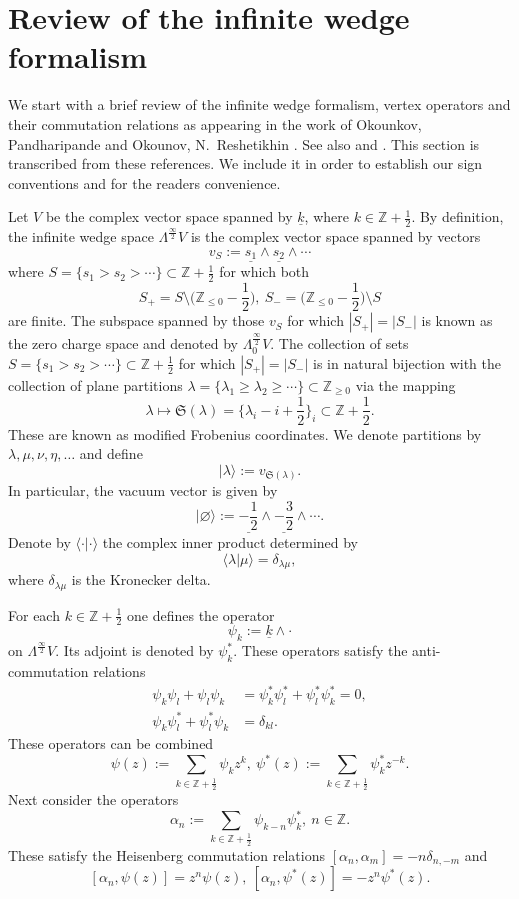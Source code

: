 \documentclass{amsart}
\theoremstyle{definition}
\newcommand{\ZZ} {\mathbb{Z}}		%
\begin{document}
\section{Review of the infinite wedge formalism}

We start with a brief review of the infinite wedge formalism, vertex operators and their commutation relations as appearing in the work of Okounkov, Pandharipande \cite{OP} and Okounov, N.~Reshetikhin \cite{OR}. See also \cite{Kac} and \cite{You}. This section is transcribed from these references. We include it in order to establish our sign conventions and for the readers convenience.

Let $V$ be the complex vector space spanned by $\underline{k}$, where $k \in \ZZ + \frac{1}{2}$. By definition, the infinite wedge space $\Lambda^{\frac{\infty}{2}} V$ is the complex vector space spanned by vectors
$$
v_S := \underline{s_1} \wedge \underline{s_2} \wedge \cdots
$$
where $S = \{s_1 > s_2 > \cdots\} \subset \ZZ + \frac{1}{2}$ for which both 
$$
S_+ = S \setminus \Big(\ZZ_{\leq 0} - \frac{1}{2} \Big), \ S_- = \Big(\ZZ_{\leq 0} - \frac{1}{2} \Big) \setminus S
$$ 
are finite. The subspace spanned by those $v_S$ for which $|S_+| = |S_-|$ is known as the zero charge space and denoted by $\Lambda^{\frac{\infty}{2}}_{0} V$. The collection of sets $S = \{s_1 > s_2 > \cdots\} \subset \ZZ + \frac{1}{2}$ for which $|S_+| = |S_-|$ is in natural bijection with the collection of plane partitions $\lambda = \{\lambda_1 \geq \lambda_2 \geq \cdots\} \subset \ZZ_{\geq 0}$ via the mapping \cite[2.1.3]{OR}
$$
\lambda \mapsto \mathfrak{S}(\lambda) = \Big\{ \lambda_i - i + \frac{1}{2} \Big\}_i \subset \ZZ + \frac{1}{2}.
$$
These are known as modified Frobenius coordinates. We denote partitions by $\lambda, \mu, \nu, \eta,  \ldots$ and define 
$$|\lambda\rangle := v_{\mathfrak{S}(\lambda)}.$$
In particular, the vacuum vector is given by
$$
|\varnothing \rangle := \underline{-\frac{1}{2}} \wedge \underline{-\frac{3}{2}} \wedge \cdots.
$$
Denote by $\langle \cdot | \cdot \rangle$ the complex inner product determined by
$$
\langle \lambda | \mu \rangle = \delta_{\lambda\mu},
$$
where $\delta_{\lambda\mu}$ is the Kronecker delta. 

For each $k \in \ZZ + \frac{1}{2}$ one defines the operator 
$$
\psi_k := \underline{k} \wedge \cdot
$$
on $\Lambda^{\frac{\infty}{2}} V$. Its adjoint is denoted by $\psi_{k}^{*}$. These operators satisfy the anti-commutation relations
\begin{align*}
\psi_k \psi_l + \psi_l \psi_k &= \psi_{k}^{*} \psi_{l}^{*} + \psi_{l}^{*} \psi_{k}^{*} = 0, \\ 
\psi_k \psi_{l}^{*} + \psi_{l}^{*} \psi_{k} &= \delta_{kl}.  
\end{align*}
These operators can be combined 
$$
\psi(z) := \sum_{k \in \ZZ + \frac{1}{2}} \psi_k z^k, \ \psi^*(z) := \sum_{k \in \ZZ + \frac{1}{2}} \psi_{k}^{*} z^{-k}. 
$$
Next consider the operators 
$$
\alpha_n := \sum_{k \in \ZZ + \frac{1}{2}} \psi_{k-n} \psi_{k}^{*}, \ n \in \ZZ.
$$
These satisfy the Heisenberg commutation relations $[\alpha_n,\alpha_m] = -n \delta_{n,-m}$ and
$$
[\alpha_n, \psi(z)] = z^{n} \psi(z), \ [\alpha_n, \psi^*(z)] =  - z^{n} \psi^*(z). 
$$
\end{document}
